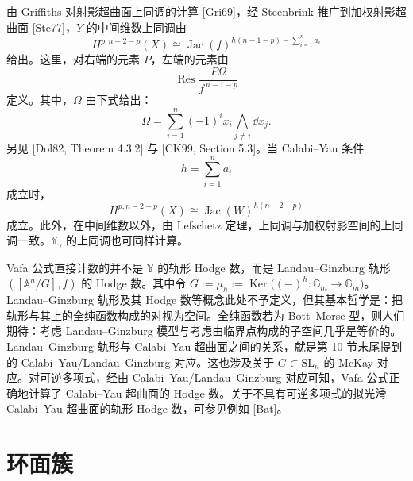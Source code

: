 由 Griffiths 对射影超曲面上同调的计算 [Gri69]，经 Steenbrink 推广到加权射影超曲面 [Ste77]，$Y$ 的中间维数上同调由
\begin{equation}
    H^{p,n-2-p}(X) \cong \operatorname{Jac}(f)^{h(n-1-p)-\sum_{i=1}^{n}a_i} \tag{11.11}
\end{equation}
给出。这里，对右端的元素 $P$，左端的元素由
\begin{equation}
    \operatorname{Res}\frac{P\Omega}{f^{\,n-1-p}} \tag{11.12}
\end{equation}
定义。其中，$\Omega$ 由下式给出：
\begin{equation}
    \Omega = \sum_{i=1}^{n}(-1)^{i}x_i\bigwedge_{j\neq i}\dd x_j. \tag{11.13}
\end{equation}
另见 [Dol82, Theorem 4.3.2] 与 [CK99, Section 5.3]。当 Calabi–Yau 条件
\begin{equation}
    h = \sum_{i=1}^{n}a_i \tag{11.14}
\end{equation}
成立时，
\begin{equation}
    H^{p,n-2-p}(X) \cong \operatorname{Jac}(W)^{h(n-2-p)} \tag{11.15}
\end{equation}
成立。此外，在中间维数以外，由 Lefschetz 定理，上同调与加权射影空间的上同调一致。$\mathbb{Y}_{\gamma}$ 的上同调也可同样计算。


Vafa 公式直接计数的并不是 $\mathbb{Y}$ 的轨形 Hodge 数，而是 Landau–Ginzburg 轨形 $([\mathbb{A}^n/G],f)$ 的 Hodge 数。其中令 $G := \mu_h := \operatorname{Ker}\bigl((-)^h\colon\mathbb{G}_m\to\mathbb{G}_m\bigr)$。Landau–Ginzburg 轨形及其 Hodge 数等概念此处不予定义，但其基本哲学是：把轨形与其上的全纯函数构成的对视为空间。全纯函数若为 Bott–Morse 型，则人们期待：考虑 Landau–Ginzburg 模型与考虑由临界点构成的子空间几乎是等价的。Landau–Ginzburg 轨形与 Calabi–Yau 超曲面之间的关系，就是第 10 节末尾提到的 Calabi–Yau/Landau–Ginzburg 对应。这也涉及关于 $G\subset\mathrm{SL}_n$ 的 McKay 对应。对可逆多项式，经由 Calabi–Yau/Landau–Ginzburg 对应可知，Vafa 公式正确地计算了 Calabi–Yau 超曲面的 Hodge 数。关于不具有可逆多项式的拟光滑 Calabi–Yau 超曲面的轨形 Hodge 数，可参见例如 [Bat]。

\section{环面簇}

